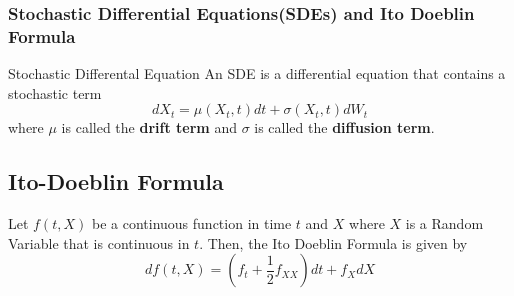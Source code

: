 \begin{frame}
	\frametitle{Stochastic Differential Equations(SDEs) and
	Ito Doeblin Formula}
	\begin{block}{Stochastic Differental Equation}
		An SDE is a differential equation that contains a stochastic term
		\[ dX_t = \mu(X_t, t)dt + \sigma(X_t, t)dW_t \]
		where \( \mu \) is called the \textbf{drift term} and
		\( \sigma \) is called the \textbf{diffusion term}.
	\end{block}

	\subsection{Ito-Doeblin Formula}
	\begin{theorem} \label{thm:ito-doeblin-formula}
		Let \( f(t, X) \) be a continuous function in time \( t \) and \( X \)
		where \( X \) is a Random Variable that is continuous in \( t \).
		Then, the Ito Doeblin Formula is given by
		\[ df(t, X) = \left( f_t + \frac{1}{2}f_{XX} \right) dt + f_{X} dX \]
	\end{theorem}
\end{frame}
